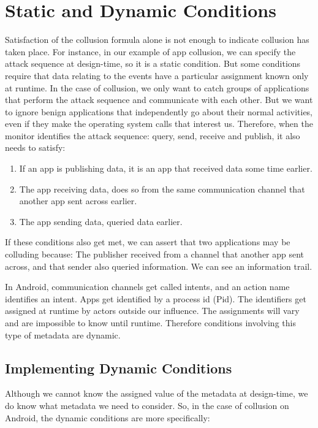 \section{Static and Dynamic Conditions}

Satisfaction of the collusion formula alone is not enough to indicate collusion has taken place. For instance, in our example of app collusion, we can specify the attack sequence at design-time, so it is a static condition.  But some conditions require that data relating to the events have a particular assignment known only at runtime.  In the case of collusion, we only want to catch groups of applications that perform the attack sequence and communicate with each other.  But we want to ignore benign applications that independently go about their normal activities, even if they make the operating system calls that interest us.  Therefore, when the monitor identifies the attack sequence: query, send, receive and publish, it also needs to satisfy:

\begin{enumerate}
\item If an app is publishing data, it is an app that received data some time earlier.
\item The app receiving data, does so from the same communication channel that another app sent across earlier.
\item The app sending data, queried data earlier.
\end{enumerate}

\noindent If these conditions also get met, we can assert that two applications may be colluding because: The publisher received from a channel that another app sent across, and that sender also queried information.  We can see an information trail.

In Android, communication channels get called intents, and an action name identifies an intent.  Apps get identified by a process id (Pid).  The identifiers get assigned at runtime by actors outside our influence.  The assignments will vary and are impossible to know until runtime.  Therefore conditions involving this type of metadata are dynamic.

\subsection{Implementing Dynamic Conditions}
\label{subsec:ImplementingDynamicConditions}

Although we cannot know the assigned value of the metadata at design-time, we do know what metadata we need to consider.  So, in the case of collusion on Android, the dynamic conditions are more specifically:

